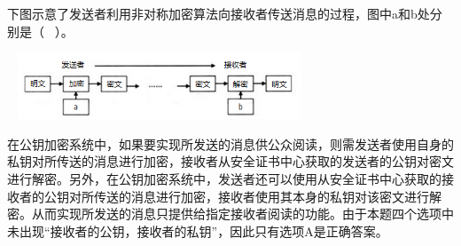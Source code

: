 \question 下图示意了发送者利用非对称加密算法向接收者传送消息的过程，图中a和b处分别是（
~）。

~
\includegraphics[width=3.33333in,height=0.78125in]{computerassets/BC3B8D19EE7AB6B46BF4430685BA419B.png}
\par{}
\begin{solution}在公钥加密系统中，如果要实现所发送的消息供公众阅读，则需发送者使用自身的私钥对所传送的消息进行加密，接收者从安全证书中心获取的发送者的公钥对密文进行解密。另外，在公钥加密系统中，发送者还可以使用从安全证书中心获取的接收者的公钥对所传送的消息进行加密，接收者使用其本身的私钥对该密文进行解密。从而实现所发送的消息只提供给指定接收者阅读的功能。由于本题四个选项中未出现``接收者的公钥，接收者的私钥''，因此只有选项A是正确答案。
\end{solution}
